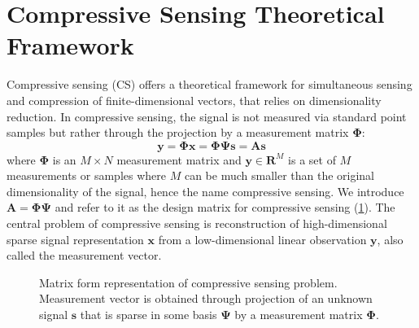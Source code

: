 \documentclass[journal]{IEEEtran}
\begin{document}
\section{Compressive Sensing Theoretical Framework} \label{sec:3}
Compressive sensing (CS) offers a theoretical framework for simultaneous sensing and compression of finite-dimensional vectors, that relies on dimensionality reduction. In compressive sensing, the signal is not measured via standard point samples but rather through the projection by a measurement matrix $\boldsymbol{\Phi}$:
%
\begin{equation}
	\boldsymbol{y}=\boldsymbol{\Phi} \boldsymbol{x}=\boldsymbol{\Phi} \boldsymbol{\Psi} \boldsymbol{s}=\boldsymbol{A} \boldsymbol{s}
\end{equation}
%
where $\boldsymbol{\Phi}$ is an $M\times N$ measurement matrix and $\boldsymbol{y}\in\mathbf{R}^M$ is a set of $M$ measurements or samples where $M$ can be much smaller than the original dimensionality of the signal, hence the name compressive sensing. We introduce $\boldsymbol{A}=\boldsymbol{\Phi}\boldsymbol{\Psi}$ and refer to it as the design matrix for compressive sensing (\ref{fig:cs_matrices}). The central problem of compressive sensing is reconstruction of high-dimensional sparse signal representation $\boldsymbol{x}$ from a low-dimensional linear observation $\boldsymbol{y}$, also called the measurement vector. 
%
\begin{figure}
	

	\caption{Matrix form representation of compressive sensing problem. Measurement vector is obtained through projection of an unknown signal $\boldsymbol{s}$ that is sparse in some basis $\boldsymbol{\Psi}$ by a measurement matrix $\boldsymbol{\Phi}$. \cite{cs_matrices_url}}
	
	\label{fig:cs_matrices}
\end{figure}
\end{document}

